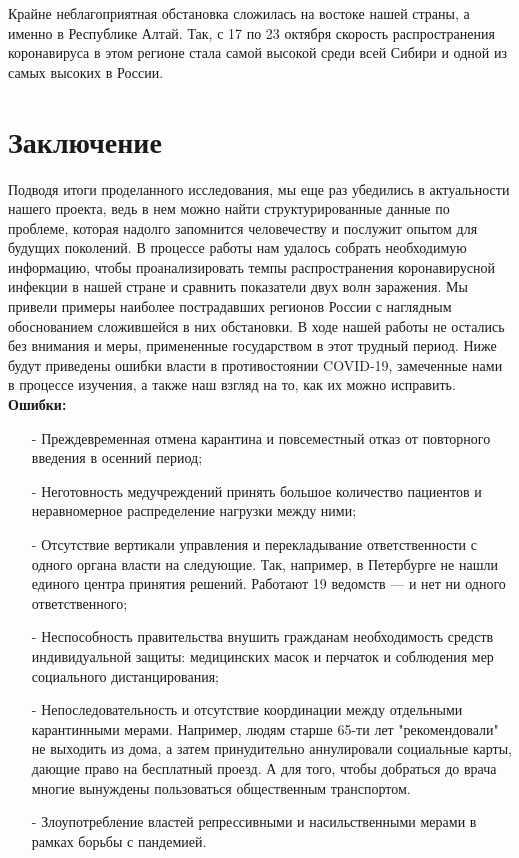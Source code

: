 \documentclass[a4paper, 12pt]{extarticle}
\begin{document}
Крайне неблагоприятная обстановка сложилась на востоке нашей страны, а именно в
Республике Алтай. Так, с 17 по 23 октября скорость распространения коронавируса
в этом регионе стала самой высокой среди всей Сибири и одной из самых высоких в
России.

\clearpage
\newpage

\section{Заключение}
Подводя итоги проделанного исследования, мы еще раз убедились в актуальности
нашего проекта, ведь в нем можно найти структурированные данные по проблеме,
которая надолго запомнится человечеству и послужит опытом для будущих
поколений.
В процессе работы нам удалось собрать необходимую
информацию, чтобы проанализировать темпы распространения коронавирусной
инфекции в нашей стране и сравнить показатели двух волн заражения. Мы привели
примеры наиболее пострадавших регионов России с наглядным обоснованием
сложившейся в них обстановки.
В ходе нашей работы не остались без внимания и меры, примененные
государством в этот трудный период. Ниже будут приведены ошибки власти в
противостоянии COVID-19, замеченные нами в процессе изучения, а также наш
взгляд на то, как их можно исправить.
\\

\textbf{Ошибки:}
\begin{itemize}
    \item[-] Преждевременная отмена карантина и повсеместный отказ от
        повторного введения в осенний период;
    \item[-] Неготовность медучреждений принять большое количество пациентов и
        неравномерное распределение нагрузки между ними;
    \item[-] Отсутствие вертикали управления и перекладывание ответственности с
        одного органа власти на следующие. Так, например, в Петербурге не нашли
        единого центра принятия решений. Работают 19 ведомств — и нет ни одного
        ответственного;
    \item[-] Неспособность правительства внушить гражданам необходимость
        средств индивидуальной защиты: медицинских масок и перчаток и соблюдения мер
        социального дистанцирования;
    \item[-] Непоследовательность и отсутствие координации между отдельными карантинными мерами.
        Например, людям старше 65-ти лет "рекомендовали" не выходить из дома, а затем принудительно
        аннулировали социальные карты, дающие право на
        бесплатный проезд. А для того, чтобы добраться до врача многие
        вынуждены пользоваться общественным транспортом.
    \item[-] Злоупотребление властей репрессивными и насильственными мерами в рамках
        борьбы с пандемией.
\end{itemize}
\end{document}
